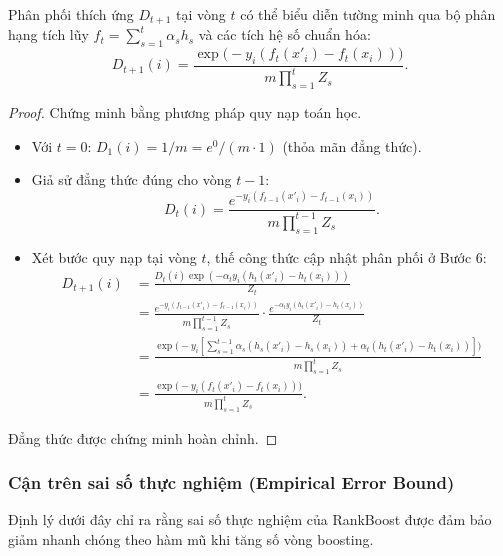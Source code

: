 Phân phối thích ứng $D_{t+1}$ tại vòng $t$ có thể biểu diễn tường minh qua bộ phân hạng tích lũy $f_t = \sum_{s=1}^t \alpha_s h_s$ và các tích hệ số chuẩn hóa:
\begin{equation}
    D_{t+1}(i) = \frac{\exp\bigl(-y_i(f_t(x'_i) - f_t(x_i))\bigr)}{m \prod_{s=1}^t Z_s}.
    \label{eq:D_t1_identity}
\end{equation}

\begin{proof}
Chứng minh bằng phương pháp quy nạp toán học.
\begin{itemize}
    \item Với $t = 0$: $D_1(i) = 1/m = e^0/(m \cdot 1)$ (thỏa mãn đẳng thức).
    \item Giả sử đẳng thức đúng cho vòng $t-1$:
    \[
        D_t(i) = \frac{e^{-y_i(f_{t-1}(x'_i) - f_{t-1}(x_i))}}{m \prod_{s=1}^{t-1} Z_s}.
    \]
    \item Xét bước quy nạp tại vòng $t$, thế công thức cập nhật phân phối ở Bước 6:
    \begin{align*}
        D_{t+1}(i)
        &= \frac{D_t(i) \exp(-\alpha_t y_i(h_t(x'_i) - h_t(x_i)))}{Z_t} \\
        &= \frac{e^{-y_i(f_{t-1}(x'_i) - f_{t-1}(x_i))}}{m \prod_{s=1}^{t-1} Z_s} \cdot \frac{e^{-\alpha_t y_i(h_t(x'_i) - h_t(x_i))}}{Z_t} \\
        &= \frac{\exp\bigl(-y_i \left[ \sum_{s=1}^{t-1} \alpha_s (h_s(x'_i) - h_s(x_i)) + \alpha_t (h_t(x'_i) - h_t(x_i)) \right]\bigr)}{m \prod_{s=1}^t Z_s} \\
        &= \frac{\exp\bigl(-y_i(f_t(x'_i) - f_t(x_i))\bigr)}{m \prod_{s=1}^t Z_s}.
    \end{align*}
\end{itemize}
Đẳng thức được chứng minh hoàn chỉnh.
\end{proof}

\subsubsection{Cận trên sai số thực nghiệm (Empirical Error Bound)}

Định lý dưới đây chỉ ra rằng sai số thực nghiệm của RankBoost được đảm bảo giảm nhanh chóng theo hàm mũ khi tăng số vòng boosting.

